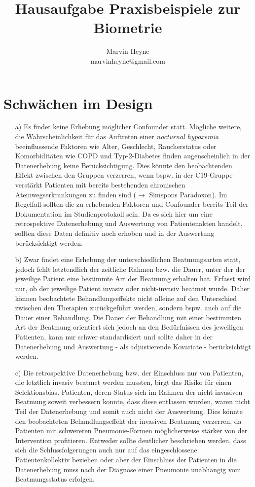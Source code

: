 \documentclass{scrartcl}
\title{Hausaufgabe Praxisbeispiele zur Biometrie}
\author{Marvin Heyne\\
  	\small marvinheyne@gmail.com \\
}
\theoremstyle{definition}
\theoremstyle{remark}
\begin{document}
\maketitle
\tableofcontents
\noindent

\section{Schwächen im Design}
\begin{enumerate}
	\item[a) ]Es findet keine Erhebung möglicher Confounder statt. Mögliche weitere, die Wahrscheinlichkeit für das Auftreten einer \textit{nocturnal hypoxemia} beeinflussende Faktoren wie Alter, Geschlecht, Raucherstatus oder Komorbiditäten wie COPD und Typ-2-Diabetes finden augenscheinlich in der Datenerhebung keine Berücksichtigung. Dies könnte den beobachtenden Effekt zwischen den Gruppen verzerren, wenn bspw. in der C19-Gruppe verstärkt Patienten mit bereits bestehenden chronischen Atemwegserkrankungen zu finden sind ($\rightarrow$ Simspons Paradoxon). Im Regelfall sollten die zu erhebenden Faktoren und Confounder bereits Teil der Dokumentation im Studienprotokoll sein. Da es sich hier um eine retrospektive Datenerhebung und Auswertung von Patientenakten handelt, sollten diese Daten definitiv noch erhoben und in der Auswertung berücksichtigt werden. 
	\item[b) ]Zwar findet eine Erhebung der unterschiedlichen Beatmungsarten statt, jedoch fehlt letztendlich der zeitliche Rahmen bzw. die Dauer, unter der der jeweilige Patient eine bestimmte Art der Beatmung erhalten hat. Erfasst wird nur, ob der jeweilige Patient invasiv oder nicht-invasiv beatmet wurde. Daher können beobachtete Behandlungseffekte nicht alleine auf den Unterschied zwischen den Therapien zurückgeführt werden, sondern bspw. auch auf die Dauer einer Behandlung. Die Dauer der Behandlung mit einer bestimmten Art der Beatmung orientiert sich jedoch an den Bedürfnissen des jeweiligen Patienten, kann nur schwer standardisiert und sollte daher in der Datenerhebung und Auswertung - als adjustierende Kovariate -  berücksichtigt werden.  
	\item[c) ]Die retrospektive Datenerhebung bzw. der Einschluss nur von Patienten, die letztlich invasiv beatmet werden mussten, birgt das Risiko für einen Selektionsbias. Patienten, deren Status sich im Rahmen der nicht-invasiven Beatmung soweit verbessern konnte, dass diese entlassen wurden, waren nicht Teil der Datenerhebung und somit auch nicht der Auswertung. Dies könnte den beobachteten Behandlungseffekt der invasiven Beatmung verzerren, da Patienten mit schwereren Pneumonie-Formen möglicherweise stärker von der Intervention profitieren. Entweder sollte deutlicher beschrieben werden, dass sich die Schlussfolgerungen auch nur auf das eingeschlossene Patientenkollektiv beziehen oder aber der Einschluss der Patienten in die Datenerhebung muss nach der Diagnose einer Pneumonie unabhängig vom Beatmungsstatus erfolgen. 

\end{enumerate}
\end{document}
